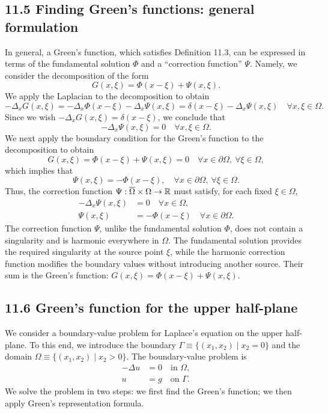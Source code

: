\subsection{11.5 Finding Green's functions: general formulation}
In general, a Green's function, which satisfies Definition 11.3, can be expressed in terms of the fundamental solution $\Phi$ and a ``correction function'' $\Psi$. Namely, we consider the decomposition of the form
\[G(x, \xi) = \Phi(x - \xi) + \Psi(x, \xi).\]
We apply the Laplacian to the decomposition to obtain
\[-\Delta_xG(x, \xi) = -\Delta_x\Phi(x - \xi) - \Delta_x\Psi(x, \xi) = \delta(x - \xi) - \Delta_x\Psi(x, \xi) \quad \forall x, \xi \in \Omega.\]
Since we wish $-\Delta_xG(x, \xi) = \delta(x - \xi)$, we conclude that
\[-\Delta_x\Psi(x, \xi) = 0 \quad \forall x, \xi \in \Omega.\]
We next apply the boundary condition for the Green's function to the decomposition to obtain
\[G(x, \xi) = \Phi(x - \xi) + \Psi(x, \xi) = 0 \quad \forall x \in \partial\Omega, \ \forall\xi \in \Omega,\]
which implies that
\[\Psi(x, \xi) = -\Phi(x - \xi), \quad \forall x \in \partial\Omega, \ \forall\xi \in \Omega.\]
Thus, the correction function $\Psi : \overline{\Omega} \times \Omega \to \mathbb{R}$ must satisfy, for each fixed $\xi \in \Omega$,
\begin{align*}
    -\Delta_x\Psi(x, \xi) &= 0 \quad \forall x \in \Omega, \\
    \Psi(x, \xi) &= -\Phi(x - \xi) \quad \forall x \in \partial\Omega.
\end{align*}
The correction function $\Psi$, unlike the fundamental solution $\Phi$, does not contain a singularity and is harmonic everywhere in $\Omega$. The fundamental solution provides the required singularity at the source point $\xi$, while the harmonic correction function modifies the boundary values without introducing another source. Their sum is the Green's function: $G(x, \xi) = \Phi(x - \xi) + \Psi(x, \xi)$.

\subsection{11.6 Green's function for the upper half-plane}
We consider a boundary-value problem for Laplace's equation on the upper half-plane. To this end, we introduce the boundary $\Gamma \equiv \{(x_1, x_2) \mid x_2 = 0\}$ and the domain $\Omega \equiv \{(x_1, x_2) \mid x_2 > 0\}$. The boundary-value problem is
\begin{equation*}
    \begin{aligned}
        -\Delta u &= 0 \quad \text{in } \Omega, \\
        u &= g \quad \text{on } \Gamma.
    \end{aligned} \tag{11.3}
\end{equation*}
We solve the problem in two steps: we first find the Green's function; we then apply Green's representation formula.

